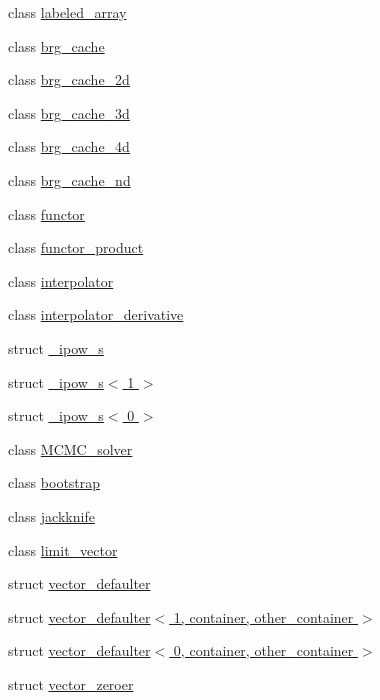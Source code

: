 \begin{DoxyCompactItemize}
class \hyperlink{classIceBRG_1_1labeled__array}{labeled\-\_\-array}
\item 
class \hyperlink{classIceBRG_1_1brg__cache}{brg\-\_\-cache}
\item 
class \hyperlink{classIceBRG_1_1brg__cache__2d}{brg\-\_\-cache\-\_\-2d}
\item 
class \hyperlink{classIceBRG_1_1brg__cache__3d}{brg\-\_\-cache\-\_\-3d}
\item 
class \hyperlink{classIceBRG_1_1brg__cache__4d}{brg\-\_\-cache\-\_\-4d}
\item 
class \hyperlink{classIceBRG_1_1brg__cache__nd}{brg\-\_\-cache\-\_\-nd}
\item 
class \hyperlink{classIceBRG_1_1functor}{functor}
\item 
class \hyperlink{classIceBRG_1_1functor__product}{functor\-\_\-product}
\item 
class \hyperlink{classIceBRG_1_1interpolator}{interpolator}
\item 
class \hyperlink{classIceBRG_1_1interpolator__derivative}{interpolator\-\_\-derivative}
\item 
struct \hyperlink{structIceBRG_1_1__ipow__s}{\-\_\-ipow\-\_\-s}
\item 
struct \hyperlink{structIceBRG_1_1__ipow__s_3_011_01_4}{\-\_\-ipow\-\_\-s$<$ 1 $>$}
\item 
struct \hyperlink{structIceBRG_1_1__ipow__s_3_010_01_4}{\-\_\-ipow\-\_\-s$<$ 0 $>$}
\item 
class \hyperlink{classIceBRG_1_1MCMC__solver}{M\-C\-M\-C\-\_\-solver}
\item 
class \hyperlink{classIceBRG_1_1bootstrap}{bootstrap}
\item 
class \hyperlink{classIceBRG_1_1jackknife}{jackknife}
\item 
class \hyperlink{classIceBRG_1_1limit__vector}{limit\-\_\-vector}
\item 
struct \hyperlink{structIceBRG_1_1vector__defaulter}{vector\-\_\-defaulter}
\item 
struct \hyperlink{structIceBRG_1_1vector__defaulter_3_011_00_01container_00_01other__container_01_4}{vector\-\_\-defaulter$<$ 1, container, other\-\_\-container $>$}
\item 
struct \hyperlink{structIceBRG_1_1vector__defaulter_3_010_00_01container_00_01other__container_01_4}{vector\-\_\-defaulter$<$ 0, container, other\-\_\-container $>$}
\item 
struct \hyperlink{structIceBRG_1_1vector__zeroer}{vector\-\_\-zeroer}
\item 

\end{DoxyCompactItemize}
